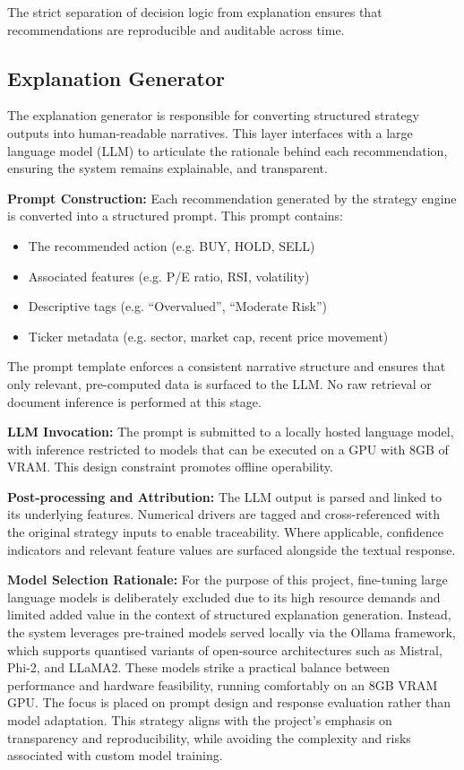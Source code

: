The strict separation of decision logic from explanation ensures that recommendations are reproducible and auditable across time.

\subsection{Explanation Generator}

The explanation generator is responsible for converting structured strategy outputs into human-readable narratives. This layer interfaces with a large language model (LLM) to articulate the rationale behind each recommendation, ensuring the system remains explainable, and transparent.

\textbf{Prompt Construction:} Each recommendation generated by the strategy engine is converted into a structured prompt. This prompt contains:
\begin{itemize}
    \item The recommended action (e.g. BUY, HOLD, SELL)
    \item Associated features (e.g. P/E ratio, RSI, volatility)
    \item Descriptive tags (e.g. “Overvalued”, “Moderate Risk”)
    \item Ticker metadata (e.g. sector, market cap, recent price movement)
\end{itemize}
The prompt template enforces a consistent narrative structure and ensures that only relevant, pre-computed data is surfaced to the LLM. No raw retrieval or document inference is performed at this stage.

\textbf{LLM Invocation:} The prompt is submitted to a locally hosted language model, with inference restricted to models that can be executed on a GPU with 8GB of VRAM. This design constraint promotes offline operability.

\textbf{Post-processing and Attribution:} The LLM output is parsed and linked to its underlying features. Numerical drivers are tagged and cross-referenced with the original strategy inputs to enable traceability. Where applicable, confidence indicators and relevant feature values are surfaced alongside the textual response.

\textbf{Model Selection Rationale:} For the purpose of this project, fine-tuning large language models is deliberately excluded due to its high resource demands and limited added value in the context of structured explanation generation. Instead, the system leverages pre-trained models served locally via the Ollama framework, which supports quantised variants of open-source architectures such as Mistral, Phi-2, and LLaMA2. These models strike a practical balance between performance and hardware feasibility, running comfortably on an 8GB VRAM GPU. The focus is placed on prompt design and response evaluation rather than model adaptation. This strategy aligns with the project’s emphasis on transparency and reproducibility, while avoiding the complexity and risks associated with custom model training.

